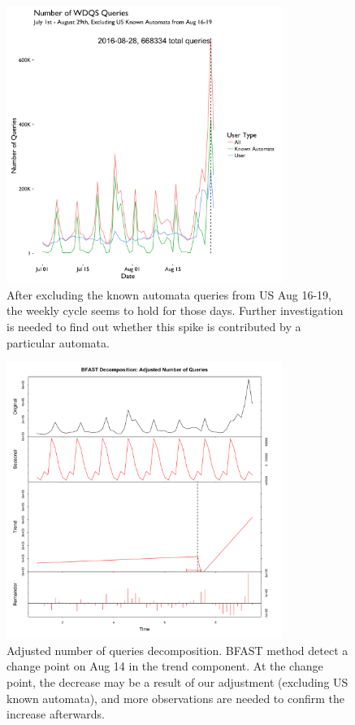 \documentclass[12pt,]{article}
\begin{document}
\begin{figure}[H]
\centering
\includegraphics[width=9cm,height=9cm,keepaspectratio]{figures/all_query_ecl_us_spider0816_ts.png}
\caption{After excluding the known automata queries from US Aug 16-19, the
weekly cycle seems to hold for those days. Further investigation is
needed to find out whether this spike is contributed by a particular
automata.\label{eclus}}
\end{figure}

\begin{figure}[H]
\centering
\includegraphics[width=9cm,height=9cm,keepaspectratio]{figures/adjust_query_decompose.png}
\caption{Adjusted number of queries decomposition. BFAST method detect a
change point on Aug 14 in the trend component. At the change point, the
decrease may be a result of our adjustment (excluding US known automata), and
more observations are needed to confirm the increase afterwards.}
\end{figure}
\end{document}
